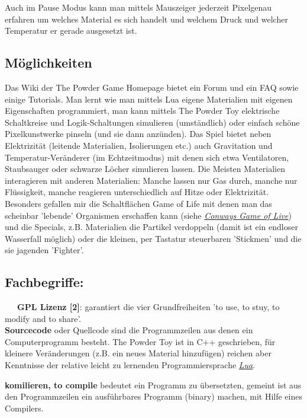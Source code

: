 \documentclass[10pt,a4paper,ngerman,twoside]{article} %
\begin{document}
\begin{multicols}{2}
\begin{center}
\end{center}
Auch im Pause Modus kann man mittels Mauszeiger jederzeit Pixelgenau erfahren um welches Material es sich handelt und welchem Druck und welcher Temperatur er gerade ausgesetzt ist. 

\subsection*{Möglichkeiten}

Das Wiki der The Powder Game Homepage bietet ein Forum und ein FAQ sowie einige Tutorials. Man lernt wie man mittels Lua eigene Materialien mit eigenen Eigenschaften programmiert, man kann mittels The Powder Toy elektrische Schaltkreise und Logik-Schaltungen simulieren (umständlich) oder einfach schöne Pixelkunstwerke pinseln (und sie dann anzünden). Das Spiel bietet neben Elektrizität (leitende Materialien, Isolierungen etc.) auch Gravitation und Temperatur-Veränderer (im Echtzeitmodus) mit denen sich etwa Ventilatoren, Staubsauger oder schwarze Löcher simulieren lassen. Die Meisten Materialien interagieren mit anderen Materialien: Manche lassen nur Gas durch, manche nur Flüssigkeit, manche reagieren unterschiedlich auf Hitze oder Elektrizität. Besonders gefallen mir die Schaltflächen Game of Life mit denen man das scheinbar 'lebende' Organismen erschaffen kann (siehe \href{https://de.wikipedia.org/wiki/Conways_Spiel_des_Lebens}{\textit{Conways Game of Live}}) und die Specials, z.B. Materialien die Partikel verdoppeln (damit ist ein endloser Wasserfall möglich) oder die kleinen, per Tastatur steuerbaren 'Stickmen' und die sie jagenden 'Fighter'. 

\subsection*{Fachbegriffe:}

~~~\textbf{GPL Lizenz [2]}: garantiert die vier Grundfreiheiten 'to use, to stuy, to modify and to share'. \\ 

\textbf{Sourcecode} oder Quellcode sind die Programmzeilen aus denen ein Computerprogramm besteht. The Powder Toy ist in C++ geschrieben, für kleinere Veränderungen (z.B. ein neues Material hinzufügen) reichen aber Kenntnisse der relative leicht zu lernenden Programmiersprache \href{https://de.wikipedia.org/wiki/Lua}{\textit{Lua}}.

\textbf{komilieren, to compile} bedeutet ein Programm zu übersetzten, gemeint ist aus den Programmzeilen ein ausführbares Programm (binary) machen, mit Hilfe eines Compilers. 


\end{multicols}
\end{document}
